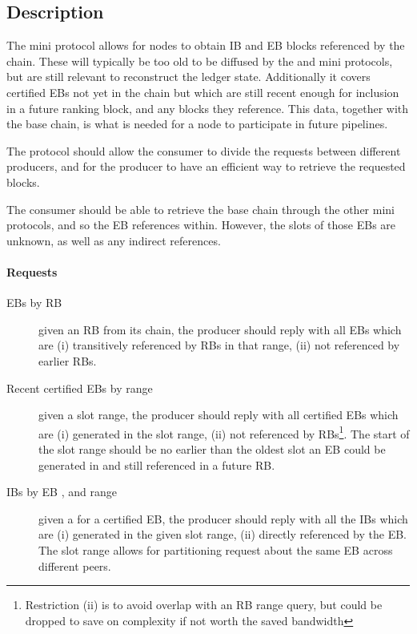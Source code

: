 \subsection{Description}
The \catchup{} mini protocol allows for nodes to obtain IB and EB
blocks referenced by the chain. These will typically be too old to be
diffused by the \relay{} and \fetch{} mini protocols, but are still
relevant to reconstruct the ledger state. Additionally it covers
certified EBs not yet in the chain but which are still recent enough
for inclusion in a future ranking block, and any blocks they
reference. This data, together with the base chain, is what is needed
for a node to participate in future pipelines.

The protocol should allow the consumer to divide the requests between
different producers, and for the producer to have an efficient way to
retrieve the requested blocks.

The consumer should be able to retrieve the base chain through the
other mini protocols, and so the EB references within. However, the
slots of those EBs are unknown, as well as any indirect references.

\paragraph{Requests}
\begin{description}
\item[EBs by RB \rbrange{}] given an RB \rbrange{} from its chain, the producer
  should reply with all EBs which are (i) transitively referenced by RBs in that
  range, (ii) not referenced by earlier RBs.
\item[Recent certified EBs by \slot{} range] given a slot range, the
  producer should reply with all certified EBs which are (i) generated
  in the slot range, (ii) not referenced by RBs\footnote{Restriction
  (ii) is to avoid overlap with an RB range query, but could be dropped to save on complexity if not worth the saved bandwidth}. The start of the
  slot range should be no earlier than the oldest slot an EB could be
  generated in and still referenced in a future RB.
\item[IBs by EB \point{}, and \slot{} range] given a \point{} for a
  certified EB, the producer should reply with all the IBs which are (i)
  generated in the given slot range, (ii) directly referenced by
  the EB. The slot range allows for partitioning request about the
  same EB across different peers.
\end{description}

